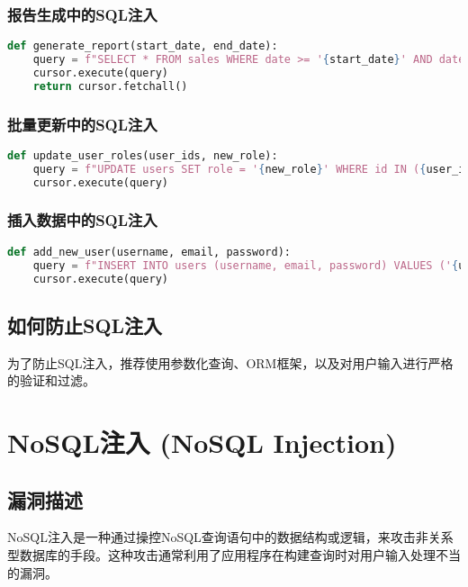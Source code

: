 \documentclass{article}
\begin{document}
\subsubsection{报告生成中的SQL注入}
\begin{lstlisting}[language=Python, caption=报告生成中的SQL注入]
def generate_report(start_date, end_date):
    query = f"SELECT * FROM sales WHERE date >= '{start_date}' AND date <= '{end_date}'"
    cursor.execute(query)
    return cursor.fetchall()
\end{lstlisting}

\subsubsection{批量更新中的SQL注入}
\begin{lstlisting}[language=Python, caption=批量更新中的SQL注入]
def update_user_roles(user_ids, new_role):
    query = f"UPDATE users SET role = '{new_role}' WHERE id IN ({user_ids})"
    cursor.execute(query)
\end{lstlisting}

\subsubsection{插入数据中的SQL注入}
\begin{lstlisting}[language=Python, caption=插入数据中的SQL注入]
def add_new_user(username, email, password):
    query = f"INSERT INTO users (username, email, password) VALUES ('{username}', '{email}', '{password}')"
    cursor.execute(query)
\end{lstlisting}

\subsection{如何防止SQL注入}
为了防止SQL注入，推荐使用参数化查询、ORM框架，以及对用户输入进行严格的验证和过滤。

\section{NoSQL注入 (NoSQL Injection)}

\subsection{漏洞描述}
NoSQL注入是一种通过操控NoSQL查询语句中的数据结构或逻辑，来攻击非关系型数据库的手段。这种攻击通常利用了应用程序在构建查询时对用户输入处理不当的漏洞。
\end{document}
